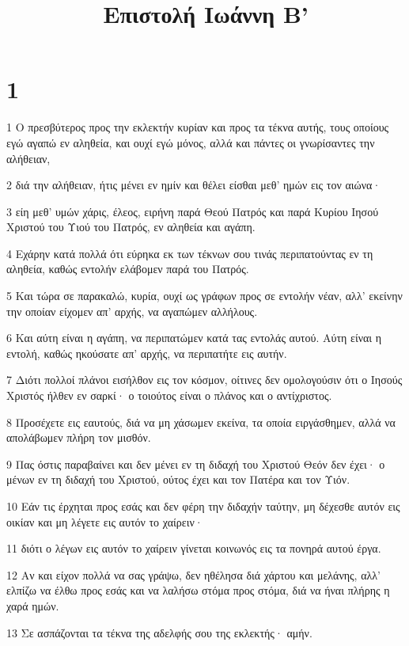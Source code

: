 

\title{Επιστολή Ιωάννη Β'}


\chapter{1}

\par 1 Ο πρεσβύτερος προς την εκλεκτήν κυρίαν και προς τα τέκνα αυτής, τους οποίους εγώ αγαπώ εν αληθεία, και ουχί εγώ μόνος, αλλά και πάντες οι γνωρίσαντες την αλήθειαν,
\par 2 διά την αλήθειαν, ήτις μένει εν ημίν και θέλει είσθαι μεθ' ημών εις τον αιώνα·
\par 3 είη μεθ' υμών χάρις, έλεος, ειρήνη παρά Θεού Πατρός και παρά Κυρίου Ιησού Χριστού του Υιού του Πατρός, εν αληθεία και αγάπη.
\par 4 Εχάρην κατά πολλά ότι εύρηκα εκ των τέκνων σου τινάς περιπατούντας εν τη αληθεία, καθώς εντολήν ελάβομεν παρά του Πατρός.
\par 5 Και τώρα σε παρακαλώ, κυρία, ουχί ως γράφων προς σε εντολήν νέαν, αλλ' εκείνην την οποίαν είχομεν απ' αρχής, να αγαπώμεν αλλήλους.
\par 6 Και αύτη είναι η αγάπη, να περιπατώμεν κατά τας εντολάς αυτού. Αύτη είναι η εντολή, καθώς ηκούσατε απ' αρχής, να περιπατήτε εις αυτήν.
\par 7 Διότι πολλοί πλάνοι εισήλθον εις τον κόσμον, οίτινες δεν ομολογούσιν ότι ο Ιησούς Χριστός ήλθεν εν σαρκί· ο τοιούτος είναι ο πλάνος και ο αντίχριστος.
\par 8 Προσέχετε εις εαυτούς, διά να μη χάσωμεν εκείνα, τα οποία ειργάσθημεν, αλλά να απολάβωμεν πλήρη τον μισθόν.
\par 9 Πας όστις παραβαίνει και δεν μένει εν τη διδαχή του Χριστού Θεόν δεν έχει· ο μένων εν τη διδαχή του Χριστού, ούτος έχει και τον Πατέρα και τον Υιόν.
\par 10 Εάν τις έρχηται προς εσάς και δεν φέρη την διδαχήν ταύτην, μη δέχεσθε αυτόν εις οικίαν και μη λέγετε εις αυτόν το χαίρειν·
\par 11 διότι ο λέγων εις αυτόν το χαίρειν γίνεται κοινωνός εις τα πονηρά αυτού έργα.
\par 12 Αν και είχον πολλά να σας γράψω, δεν ηθέλησα διά χάρτου και μελάνης, αλλ' ελπίζω να έλθω προς εσάς και να λαλήσω στόμα προς στόμα, διά να ήναι πλήρης η χαρά ημών.
\par 13 Σε ασπάζονται τα τέκνα της αδελφής σου της εκλεκτής· αμήν.


